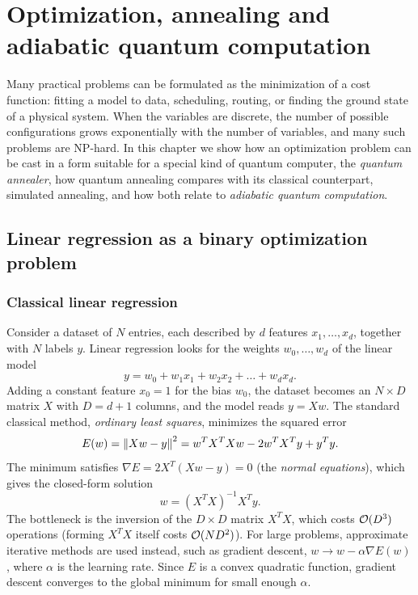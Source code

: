 \chapter[Annealing and adiabatic computation]{Optimization, annealing and adiabatic quantum computation}\label{ch:annealing}

Many practical problems can be formulated as the minimization of a cost function: fitting a model to data, scheduling, routing, or finding the ground state of a physical system. When the variables are discrete,
the number of possible configurations grows exponentially with the number of variables, and many such problems are NP-hard. In this chapter we show how an optimization problem can be cast in a form suitable for
a special kind of quantum computer, the \emph{quantum annealer}, how quantum annealing compares with its classical counterpart, simulated annealing, and how both relate to \emph{adiabatic quantum computation}.

\section{Linear regression as a binary optimization problem}
\subsection{Classical linear regression}
Consider a dataset of $N$ entries, each described by $d$ features $x_1,\dots,x_d$, together with $N$ labels $y$. Linear regression looks for the weights $w_0,\dots,w_d$ of the linear model
\begin{equation}
  y=w_0+w_1x_1+w_2x_2+\dots+w_dx_d .
\end{equation}
Adding a constant feature $x_0=1$ for the bias $w_0$, the dataset becomes an $N\times D$ matrix $X$ with $D=d+1$ columns, and the model reads $y=Xw$. The standard classical method, \emph{ordinary least squares},
minimizes the squared error
\begin{equation}
  E(w)=\left\|Xw-y\right\|^2=w^TX^TXw-2w^TX^Ty+y^Ty.
\end{equation}
The minimum satisfies $\nabla E=2X^T(Xw-y)=0$ (the \emph{normal equations}), which gives the closed-form solution
\begin{equation}
  w=(X^TX)^{-1}X^Ty.
\end{equation}
The bottleneck is the inversion of the $D\times D$ matrix $X^TX$, which costs $\mathcal O(D^3)$ operations (forming $X^TX$ itself costs $\mathcal O(ND^2)$). For large problems, approximate iterative methods are used instead,
such as gradient descent, $w\to w-\alpha\nabla E(w)$, where $\alpha$ is the learning rate. Since $E$ is a convex quadratic function, gradient descent converges to the global minimum for small enough $\alpha$.


